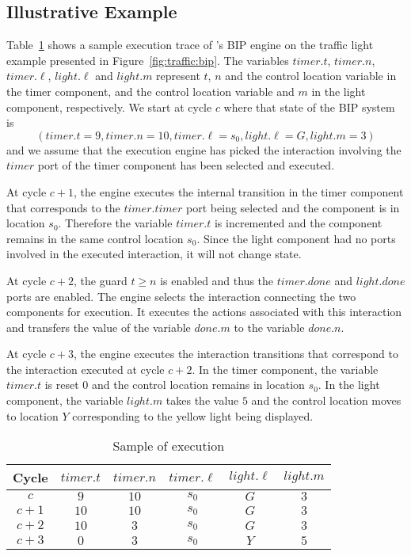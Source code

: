 \subsection{Illustrative Example}
Table~\ref{tb:bip:exec} shows a sample execution trace of \mytool's BIP engine
on the traffic light example presented in Figure~\ref{fig:traffic:bip}. The variables 
$timer.t$, $timer.n$, $timer.\ell$, $light.\ell$ and $light.m$ represent $t$, $n$
and the control location variable in the timer component, and the control location variable
and $m$ in the light component, respectively. 
We start at cycle $c$ where that state of the BIP system is $$\left(timer.t = 9, timer.n = 10,
timer.\ell = s_0, light.\ell = G, light.m = 3\right)$$
and we assume that the execution engine has picked the interaction involving the 
$timer$ port of the timer component has been selected and executed. 

At cycle $c+1$, the engine executes the internal transition in the timer component
that corresponds to the $timer.timer$ port being selected and the component is in location $s_0$. 
Therefore the variable $timer.t$ is incremented and the component 
remains in the same control location $s_0$. Since the light component
had no ports involved in the executed interaction, it will not change 
state. 

At cycle $c+2$, the guard $t \geq n$ is enabled and thus the $timer.done$ and $light.done$ ports are enabled. 
The engine selects the interaction connecting the two components
for execution. It executes the actions associated with this interaction 
and transfers the value of the variable $done.m$ to the variable $done.n$.

At cycle $c+3$, the engine executes the interaction transitions that 
correspond to the interaction executed at cycle $c+2$. In the timer 
component, the variable $timer.t$ is reset $0$ and the control location 
remains in location $s_0$. In the light component, the variable 
$light.m$ takes the value $5$ and the control location moves to location 
$Y$ corresponding to the yellow light being displayed. 

\begin{table}[bt]
\centering
\caption{Sample of \biptool{} execution}
\begin{tabular}{|c|c|c|c|c|c|}
\hline
Cycle & $timer.t$ & $timer.n$ & $timer.\ell$ & $light.\ell$ & $light.m$ \\ 
\hline
$c$ & $9$ & $10$ & $s_0$ & $G$ & $3$ \\
		\hline
		$c+1$ & $10$ & $10$ & $s_0$ & $G$ & $3$ \\
			\hline
			$c+2$ & $10$ & $3$ & $s_0$ & $G$ & $3$ \\
				\hline
	 $c+3$ & $0$ & $3$ & $s_0$ & $Y$ & $5$ \\
	 \hline
\end{tabular}
\label{tb:bip:exec}
\end{table}

